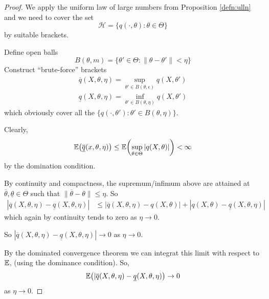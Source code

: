 \begin{proof}
  We apply the uniform law of large numbers from Proposition
  \ref{defn:ulln}  and we need to cover the set
  \begin{equation}
    \label{eq:52}
    \mathcal{H} = \{ q(\cdot, \theta) : \theta \in \Theta \}
  \end{equation} by suitable brackets.

  Define open balls
  \begin{equation}
    \label{eq:53}
    B(\theta, m) = \{ \theta' \in \Theta: \| \theta -  \theta' \| <
    \eta \}
  \end{equation}
  Construct ``brute-force'' brackets
  \begin{align}
    \label{eq:54} \overline q(X, \theta, \eta) = \sup_{\theta' \in
      B(\theta, \epsilon)} q(X, \theta') \\ \underline q(X, \theta,
    \eta) = \inf_{\theta' \in B(\theta, \eta)} q(X, \theta')
  \end{align} which obviously cover all the $\{ q(\cdot, \theta') :
  \theta' \in B(\theta, \eta) \}$.

  Clearly,
  \begin{align}
    \label{eq:55} \E{\overline{\underline q}(x, \theta, \eta)} \leq
    \E{\sup_{\theta \in \Theta} | q(X, \theta) |} < \infty
  \end{align} by the domination condition.

  By continuity and compactness, the supremum/infimum above are
  attained at $\overline \theta, \underline \theta \in \Theta$ such
  that $\| \overline \theta - \theta \| \leq \eta$. So
  \begin{align}
    \label{eq:56} | \overline q (X, \theta, \eta) - \underline q(X,
    \theta, \eta) | &\leq | \overline q(X, \theta, \eta) - q(X,
    \theta) | + | q(X, \theta) - \underline q (X, \theta, \eta) |
  \end{align} which again by continuity tends to zero as $\eta
  \rightarrow 0$.

  So $| \overline q(X, \theta, \eta) - \underline q(X, \theta, \eta)|
  \rightarrow 0$ as $\eta \rightarrow 0$.

  By the dominated convergence theorem we can integrat this limit with
  respect to $\E$, (using the dominance condition).  So,
  \begin{equation}
    \label{eq:57}
    \E{|\overline q(X, \theta, \eta) - \underline q(X, \theta, \eta)}
    \rightarrow 0
  \end{equation} as $\eta \rightarrow 0$.


\end{proof}
